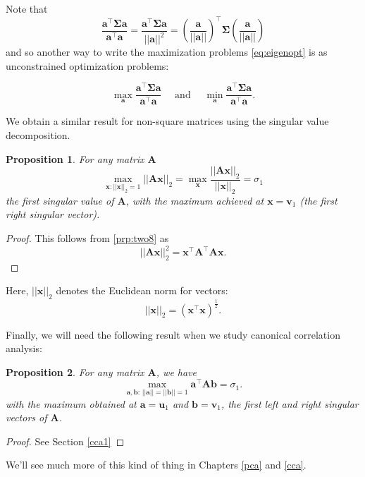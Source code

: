 \documentclass[
]{book}
\newtheorem{proposition}{Proposition}[chapter]
\theoremstyle{definition}
\theoremstyle{definition}
\theoremstyle{definition}
\theoremstyle{definition}
\theoremstyle{remark}
\begin{document}
Note that \[\frac{\mathbf a^\top \boldsymbol{\Sigma}\mathbf a}{\mathbf a^\top\mathbf a}=\frac{\mathbf a^\top \boldsymbol{\Sigma}\mathbf a}{||\mathbf a||^2} = (\frac{\mathbf a}{||\mathbf a||})^\top \boldsymbol{\Sigma}(\frac{\mathbf a}{||\mathbf a||})\]
and so another way to write the maximization problems \eqref{eq:eigenopt} is as unconstrained optimization problems:

\[\max_{\mathbf a}\frac{\mathbf a^\top \boldsymbol{\Sigma}\mathbf a}{\mathbf a^\top\mathbf a}\quad \mbox{ and } \quad \min_{\mathbf a}\frac{\mathbf a^\top \boldsymbol{\Sigma}\mathbf a}{\mathbf a^\top\mathbf a}.\]

We obtain a similar result for non-square matrices using the singular value decomposition.

\begin{proposition}
\protect\hypertarget{prp:svdmax1}{}\label{prp:svdmax1}For any matrix \(\mathbf A\)
\[\max_{\mathbf x: ||\mathbf x||_2=1}||\mathbf A\mathbf x||_2=\max_{\mathbf x}\frac{||\mathbf A\mathbf x||_2}{||\mathbf x||_2}=\sigma_1\]
the first singular value of \(\mathbf A\), with the maximum achieved at \(\mathbf x=\mathbf v_1\) (the first right singular vector).
\end{proposition}

\begin{proof}
This follows from \ref{prp:two8} as
\[||\mathbf A\mathbf x||_2^2=\mathbf x^\top \mathbf A^\top\mathbf A\mathbf x.\]
\end{proof}

Here, \(||\mathbf x||_2\) denotes the Euclidean norm for vectors:
\[||\mathbf x||_2 = (\mathbf x^\top \mathbf x)^{\frac{1}{2}}.\]

Finally, we will need the following result when we study canonical correlation analysis:

\begin{proposition}
\protect\hypertarget{prp:svdmax2}{}\label{prp:svdmax2}For any matrix \(\mathbf A\), we have
\[
\max_{\mathbf a, \mathbf b:\, \vert \vert \mathbf a\vert \vert=\vert \vert \mathbf b\vert \vert =1} \mathbf a^\top \mathbf A\mathbf b=\sigma_1.
\]
with the maximum obtained at \(\mathbf a=\mathbf u_1\) and \(\mathbf b=\mathbf v_1\), the first left and right singular vectors of \(\mathbf A\).
\end{proposition}

\begin{proof}
See Section \ref{cca1}
\end{proof}

We'll see much more of this kind of thing in Chapters \ref{pca} and \ref{cca}.
\end{document}
